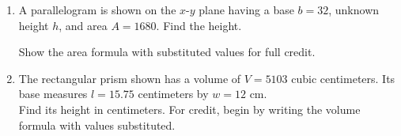 \begin{enumerate}
\item A parallelogram is shown on the $x$-$y$ plane having a base $b=32$, unknown height $h$, and area $A=1680$. Find the height. 
  \begin{multicols}{2}
    Show the area formula with substituted values for full credit.
      \begin{flushright}
      \end{flushright}
  \end{multicols} 

\item The rectangular prism shown has a volume of $V=5103$ cubic centimeters. Its base measures $l=15.75$ centimeters by $w=12$ cm. \\[0.5cm]
Find its height in centimeters. For credit, begin by writing the volume formula with values substituted.
\begin{flushright}
\end{flushright}


\end{enumerate}
